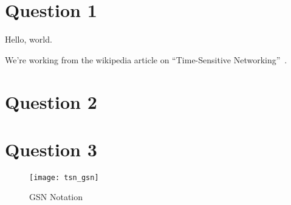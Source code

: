 \section{Question 1}

Hello, world.

We're working from the wikipedia article on ``Time-Sensitive Networking''~\cite{TimeSensitiveNetworking2023}.

\section{Question 2}

\section{Question 3}

\begin{figure}[h]
\centering
\texttt{[image: tsn\_gsn]}
\caption{GSN Notation}
\end{figure}
